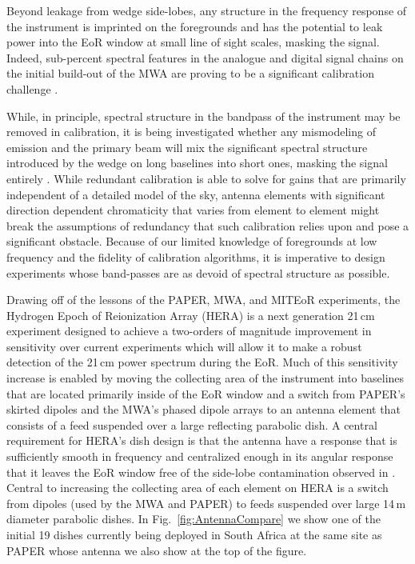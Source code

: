 \documentclass[twocolumn]{emulateapj}
\begin{document}
Beyond leakage from wedge side-lobes, any structure in the frequency response of the instrument is imprinted on the foregrounds and has the potential to leak power into the EoR window at small line of sight scales, masking the signal. Indeed, sub-percent spectral features in the analogue and digital signal chains on the initial build-out of the MWA are proving to be a significant calibration challenge \citep{Dillon:2015b,EwallWice:2015a,Beardsley:2015b}. 

While, in principle, spectral structure in the bandpass of the instrument may be removed in calibration, it is being investigated whether any mismodeling of emission and the primary beam will mix the significant spectral structure introduced by the wedge on long baselines into short ones, masking the signal entirely \citep{Barry:2016}. While redundant calibration \citep{Wieringa:1992,Liu:2010,Zheng:2014} is able to solve for gains that are primarily independent of a detailed model of the sky, antenna elements with significant direction dependent chromaticity that varies from element to element might break the assumptions of redundancy that such calibration relies upon and pose a significant obstacle. Because of our limited knowledge of foregrounds at low frequency and the fidelity of calibration algorithms, it is imperative to design experiments whose band-passes are as devoid of spectral structure as possible.

Drawing off of the lessons of the PAPER, MWA, and MITEoR experiments, the Hydrogen Epoch of Reionization Array (HERA) \citep{Pober:2014,DeBoer:2016} is a next generation 21\,cm experiment designed to achieve a two-orders of magnitude improvement in sensitivity over current experiments which will allow it to make a robust detection of the 21\,cm power spectrum during the EoR. Much of this sensitivity increase is enabled by moving the collecting area of the instrument into baselines that are located primarily inside of the EoR window and a switch from PAPER's skirted dipoles and the MWA's phased dipole arrays to an antenna element that consists of a feed suspended over a large reflecting parabolic dish. A central requirement for HERA's dish design is that the antenna have a response that is sufficiently smooth in frequency and centralized enough in its angular response that it leaves the EoR window free of the side-lobe contamination observed in \citep{Thyagarajan:2015a,Thyagarajan:2015b,Pober:2016}. Central to increasing the collecting area of each element on HERA is a switch from dipoles (used by the MWA and PAPER) to feeds suspended over large 14\,m diameter parabolic dishes. In Fig.~\ref{fig:AntennaCompare} we show one of the initial 19 dishes currently being deployed in South Africa at the same site as PAPER whose antenna we also show at the top of the figure.
\end{document}
